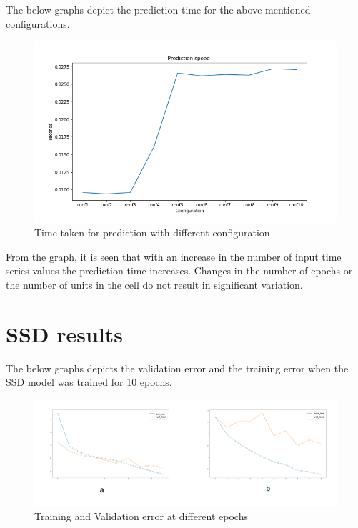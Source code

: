The below graphs depict the prediction time for the above-mentioned configurations.

\begin{figure}[H]
\includegraphics[scale=0.8]{time-taken-for-prediction.png}
\begin{center}
\caption{Time taken for prediction with different configuration}
\end{center}
\end{figure}

From the graph, it is seen that with an increase in the number of input time series values the prediction time increases. Changes in the number of epochs or the number of units in the cell do not result in significant variation.

\section{SSD results}
The below graphs depicts the validation error and the training error when the SSD model was trained for 10 epochs.

\begin{figure}[H]
\includegraphics[scale=0.7]{ssd-training}
\begin{center}
\caption{Training and Validation error at different epochs}
\label{fig:ssd-training}
\end{center}
\end{figure}

